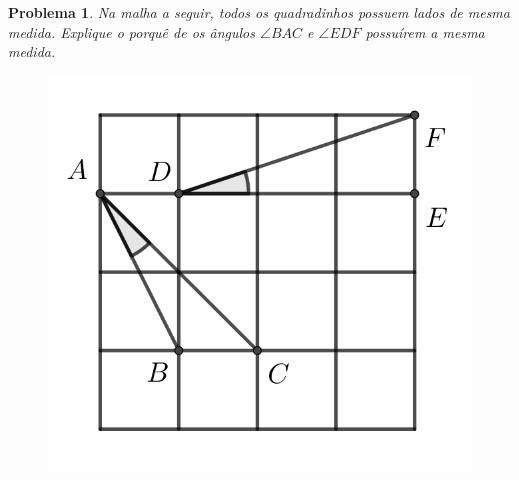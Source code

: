 \documentclass{hipatia}
\newtheorem{problem*}{Problema}
\begin{document}
\begin{problem*}
Na malha a seguir, todos os quadradinhos possuem lados de mesma medida. Explique o porquê de os ângulos $\angle BAC$ e $\angle EDF$ possuírem a mesma medida. 
	
	\begin{center}	
		\begin{figure}[!h]
	\centering
	\includegraphics[width=0.3\linewidth]{2024S17.png}
\end{figure}
\end{center}	
\end{problem*}
\end{document}
